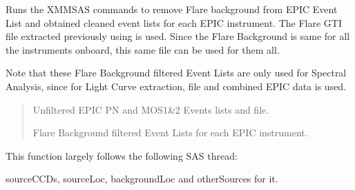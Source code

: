 \documentclass[letterpaper,10pt,english]{sphinxmanual}
\begin{document}
\begin{fulllineitems}

\begin{fulllineitems}
\label{\detokenize{xmmPipeline:xmmPipeline.epicObj.epicObj.removeFlareBackground}}
\pysigstartsignatures
{}
\pysigstopsignatures
\sphinxAtStartPar
Runs the XMMSAS commands to remove Flare background from EPIC Event List
and obtained cleaned event lists for each EPIC instrument.
The Flare GTI file extracted previously using  is used.
Since the Flare Background is same for all the instruments onboard,
this same  file can be used for them all.

\sphinxAtStartPar
Note that these Flare Background filtered Event Lists are only used for
Spectral Analysis, since for Light Curve extraction,  file
and combined  EPIC data is used.
\begin{quote}\begin{description}
\sphinxAtStartPar
Unfiltered EPIC PN and MOS1\&2 Events lists and  file.

\sphinxAtStartPar
Flare Background filtered Event Lists for each EPIC instrument.

\end{description}\end{quote}

\sphinxAtStartPar
This function largely follows the following SAS thread:

\end{fulllineitems}


\begin{fulllineitems}
\label{\detokenize{xmmPipeline:xmmPipeline.epicObj.epicObj.save_results}}
\pysigstartsignatures
{}
\pysigstopsignatures\begin{description}
\begin{description}
\sphinxAtStartPar
sourceCCDs, sourceLoc, backgroundLoc and otherSources for it.


\end{description}
\end{description}
\end{fulllineitems}
\end{fulllineitems}
\end{document}
